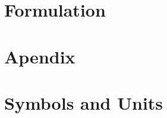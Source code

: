 \documentclass[fleqn,10pt]{SelfArx} %
\begin{document}
\flushbottom    %
\maketitle      %
\tableofcontents

\thispagestyle{empty} %

\section{Formulation}


\section{Apendix}


\section{Symbols and Units}




\end{document}
